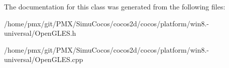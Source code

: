 The documentation for this class was generated from the following files\+:\begin{DoxyCompactItemize}
\item 
/home/pmx/git/\+P\+M\+X/\+Simu\+Cocos/cocos2d/cocos/platform/win8.-\/universal/Open\+G\+L\+E\+S.\+h\item 
/home/pmx/git/\+P\+M\+X/\+Simu\+Cocos/cocos2d/cocos/platform/win8.-\/universal/Open\+G\+L\+E\+S.\+cpp\end{DoxyCompactItemize}
